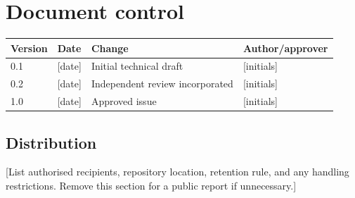 \chapter*{Document control}

\begin{tabularx}{\textwidth}{@{}l l X l@{}}
  \toprule
  Version & Date & Change & Author/approver \\
  \midrule
  0.1 & [date] & Initial technical draft & [initials] \\
  0.2 & [date] & Independent review incorporated & [initials] \\
  1.0 & [date] & Approved issue & [initials] \\
  \bottomrule
\end{tabularx}

\section*{Distribution}
[List authorised recipients, repository location, retention rule, and any
handling restrictions. Remove this section for a public report if unnecessary.]
